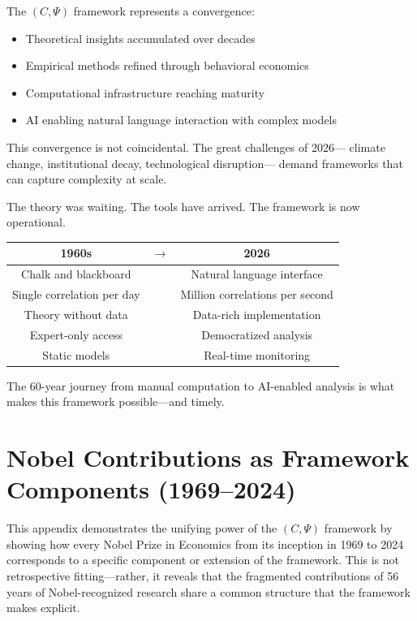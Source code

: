 \documentclass[12pt,a4paper]{article}
\begin{document}
The $(C, \Psi)$ framework represents a convergence:
\begin{itemize}
  \item Theoretical insights accumulated over decades
  \item Empirical methods refined through behavioral economics
  \item Computational infrastructure reaching maturity
  \item AI enabling natural language interaction with complex models
\end{itemize}

This convergence is not coincidental. The great challenges of 2026---
climate change, institutional decay, technological disruption---
demand frameworks that can capture complexity at scale.

The theory was waiting. The tools have arrived.
The framework is now operational.

\begin{center}
\renewcommand{\arraystretch}{1.3}
\begin{tabular}{ccc}
\hline
\textbf{1960s} & $\longrightarrow$ & \textbf{2026} \\
\hline
Chalk and blackboard & & Natural language interface \\
Single correlation per day & & Million correlations per second \\
Theory without data & & Data-rich implementation \\
Expert-only access & & Democratized analysis \\
Static models & & Real-time monitoring \\
\hline
\end{tabular}
\end{center}

The 60-year journey from manual computation to AI-enabled analysis
is what makes this framework possible---and timely.

\section{Nobel Contributions as Framework Components (1969--2024)}
\label{app:nobel}

This appendix demonstrates the unifying power of the $(C, \Psi)$ framework
by showing how every Nobel Prize in Economics from its inception in 1969 to 2024 
corresponds to a specific component or extension of the framework.
This is not retrospective fitting---rather, it reveals that the fragmented
contributions of 56 years of Nobel-recognized research share a common structure
that the framework makes explicit.
\end{document}
